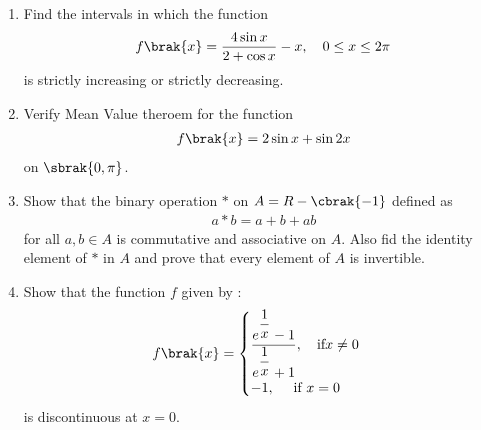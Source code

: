 \begin{enumerate}
    \item Find the intervals in which the function
          \begin{align*}
              f\brak{x}= \dfrac{4\sin x}{2+\cos x} -x,\quad 0 \leq x \leq 2\pi
          \end{align*}
          is strictly increasing or strictly decreasing.
    \item Verify Mean Value theroem for the function
          \begin{align*}
              f\brak{x}= 2\sin x + \sin 2x
          \end{align*}
          on $\sbrak{0,\pi}$.
    \item Show that the binary operation $*$ on $ A=R -\cbrak{-1}$ defined as
          \begin{align*}
              a*b= a+b+ab
          \end{align*}
          for all $a,b \in A$ is commutative and associative on $A$. Also fid the identity element of $*$ in $A$ and prove that every element of $A$ is invertible.\item Show that the function $f$ given by :
          \begin{align*}
              f\brak{x} = \begin{cases}
                              \dfrac{e^{\dfrac{1}{x}}-1}{e^{\dfrac{1}{x}}+1} ,\quad \text{if} x\neq 0 \\
                              -1,\quad \text{ if } x=0
                          \end{cases}
          \end{align*}
          is discontinuous at $x=0$.
\end{enumerate}